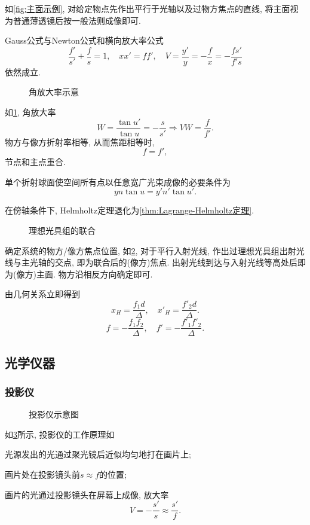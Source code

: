 \documentclass{ctexart}
\begin{document}
\begin{sample}
    \begin{ex}
        如\cref{fig:主面示例}, 对给定物点先作出平行于光轴以及过物方焦点的直线, 将主面视为普通薄透镜后按一般法则成像即可.
    \end{ex}
\end{sample}
Gauss公式与Newton公式和横向放大率公式
\[ \frac{f'}{s'} + \frac{f}{s} = 1,\quad xx' = ff',\quad V = \frac{y'}{y} = - \frac{f}{x} = -\frac{fs'}{f's} \]
依然成立.
\begin{figure}
    \centering
    \caption{角放大率示意}
    \label{fig:角放大率示意}
\end{figure}
如\cref{fig:角放大率示意}, 角放大率
\[ W = \frac{\tan u'}{\tan u} = -\frac{s}{s'} \Rightarrow VW = \frac{f}{f'}. \]
物方与像方折射率相等, 从而焦距相等时,
\[ f = f', \]
节点和主点重合.
\begin{theorem}[Helmholtz定理]
    \label{thm:Helmholtz定理}
    单个折射球面使空间所有点以任意宽广光束成像的必要条件为
    \[ yn\tan u = y'n'\tan u'. \]
\end{theorem}
在傍轴条件下, Helmholtz定理退化为\cref{thm:Lagrange-Helmholtz定理}.
\begin{figure}
    \centering
    \caption{理想光具组的联合}
    \label{fig:理想光具组的联合}
\end{figure}
确定系统的物方/像方焦点位置, 如\cref{fig:理想光具组的联合}, 对于平行入射光线, 作出过理想光具组出射光线与主光轴的交点, 即为联合后的(像方)焦点. 出射光线到达与入射光线等高处后即为(像方)主面. 物方沿相反方向确定即可.
\par
由几何关系立即得到
\[ x_H = \frac{f_1 d}{\Delta},\quad x'_H = \frac{f'_2 d}{\Delta}. \]
\[ f = -\frac{f_1f_2}{\Delta},\quad f' = -\frac{f'_1 f'_2}{\Delta}. \]


\subsection{光学仪器} %
\label{sub:光学仪器}

\subsubsection{投影仪} %
\label{ssub:投影仪}

\begin{figure}[ht]
    \centering
    \caption{投影仪示意图}
    \label{fig:投影仪示意图}
\end{figure}
如\cref{fig:投影仪示意图}所示, 投影仪的工作原理如
\begin{cenum}
    \item 光源发出的光通过聚光镜后近似均匀地打在画片上;
    \item 画片处在投影镜头前$s\approx f$的位置;
    \item 画片的光通过投影镜头在屏幕上成像, 放大率
    \[ V = -\frac{s'}{s} \approx \frac{s'}{f}. \]
\end{cenum}
\end{document}
